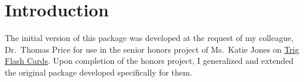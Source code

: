 \documentclass{article}
\begin{document}
\maketitle

\tableofcontents
{}







\def\AcroT{Acro\!\TeX}\def\cAcroT{\textcolor{blue}{\AcroT}}
\def\AcroEB{\AcroT{} eDucation Bundle}\def\cAcroEB{\textcolor{blue}{\AcroEB}}
\def\AcroB{\AcroT{} Bundle}\def\cAcroB{\textcolor{blue}{\AcroB}}
\def\bUrl{http://www.math.uakron.edu/~dpstory}

\hypersetup{linktocpage}

%



%

\section{Introduction}

The initial version of this package was developed at the request of my colleague, Dr.\ Thomas
Price for use in the senior honors project of Ms.\ Katie Jones on
\href{http://www.math.uakron.edu/~teprice/Trig/}{Trig Flash Cards}.
Upon completion of the honors project, I generalized and extended
the original package developed specifically for them.
\end{document}
